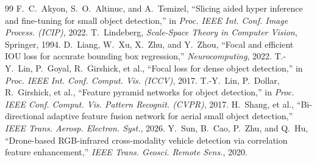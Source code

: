 \documentclass[12pt,a4paper]{report}
\begin{document}
\begin{thebibliography}{99}
 F.~C.~Akyon, S.~O.~Altinuc, and A.~Temizel, ``Slicing aided hyper inference and fine-tuning for small object detection,'' in \emph{Proc. IEEE Int. Conf. Image Process. (ICIP)}, 2022.
 T.~Lindeberg, \emph{Scale-Space Theory in Computer Vision}, Springer, 1994.
 D.~Liang, W.~Xu, X.~Zhu, and Y.~Zhou, ``Focal and efficient IOU loss for accurate bounding box regression,'' \emph{Neurocomputing}, 2022.
 T.-Y.~Lin, P.~Goyal, R.~Girshick, et al., ``Focal loss for dense object detection,'' in \emph{Proc. IEEE Int. Conf. Comput. Vis. (ICCV)}, 2017.
 T.-Y.~Lin, P.~Dollar, R.~Girshick, et al., ``Feature pyramid networks for object detection,'' in \emph{Proc. IEEE Conf. Comput. Vis. Pattern Recognit. (CVPR)}, 2017.
 H.~Shang, et al., ``Bi-directional adaptive feature fusion network for aerial small object detection,'' \emph{IEEE Trans. Aerosp. Electron. Syst.}, 2026.
 Y.~Sun, B.~Cao, P.~Zhu, and Q.~Hu, ``Drone-based RGB-infrared cross-modality vehicle detection via correlation feature enhancement,'' \emph{IEEE Trans. Geosci. Remote Sens.}, 2020.
\end{thebibliography}
\end{document}
